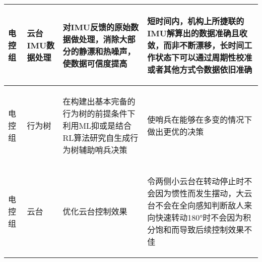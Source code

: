 \begin{longtable}{ p{1.5cm} | p{3cm} | p{6cm} | p{4.3cm} |}
       \begin{center}
           电控组
       \end{center} &
       \begin{center}
           云台IMU数据处理
       \end{center} &
       \begin{center}
           对IMU反馈的原始数据做处理，消除大部分的静漂和热噪声，使数据可信度提高
       \end{center} &
       \begin{center}
           短时间内，机构上所捷联的IMU解算出的数据准确且收敛，而非不断漂移，长时间工作状态下可以通过周期性校准或者其他方式令数据依旧准确
       \end{center} \\
        
    \hline
    
        \begin{center}
            电控组
        \end{center}&
        \begin{center}
            行为树
        \end{center}&
        \begin{center}
            在构建出基本完备的行为树的前提条件下利用ML抑或是结合RL算法研究自生成行为树辅助哨兵决策
        \end{center}&
        \begin{center}
            使哨兵在能够在多变的情况下做出更优的决策
        \end{center}\\

    \hline
    

       \begin{center}
           电控组
       \end{center} &
       \begin{center}
           云台
       \end{center} &
       \begin{center}
           优化云台控制效果
       \end{center} &
       \begin{center}
           令两侧小云台在转动停止时不会因为惯性而发生摆动，大云台不会在全向感知判断敌人来向快速转动180°时不会因为积分饱和而导致后续控制效果不佳
       \end{center} \\


\end{longtable}
